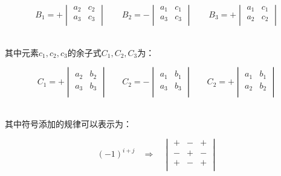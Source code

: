 \documentclass[UTF8]{ctexart}
\begin{document}
    \begin{large}
        \begin{equation*}
            B_1=+
            \begin{vmatrix}
                a_2&c_2\\
                a_3&c_3\\
            \end{vmatrix}~~~~~~~~\,
            B_2=-
            \begin{vmatrix}
                a_1&c_1\\
                a_3&c_3\\
            \end{vmatrix}~~~~~~~~\,
            B_3=+
            \begin{vmatrix}
                a_1&c_1\\
                a_2&c_2\\
            \end{vmatrix}
        \end{equation*}
    \end{large}\\
    其中元素$c_1,c_2,c_3$的余子式$C_1,C_2,C_3$为：\vspace{5pt}
    \begin{large}
        \begin{equation*}
            C_1=+
            \begin{vmatrix}
                a_2&b_2\\
                a_3&b_3\\
            \end{vmatrix}~~~~~~~~
            C_2=-
            \begin{vmatrix}
                a_1&b_1\\
                a_3&b_3\\
            \end{vmatrix}~~~~~~~~
            C_2=+
            \begin{vmatrix}
                a_1&b_1\\
                a_2&b_2\\
            \end{vmatrix}
        \end{equation*}
    \end{large}\\[3mm]
    其中符号添加的规律可以表示为：
    \begin{large}
        \begin{equation*}
            (-1)^{i+j}~~~~\Longrightarrow~~~~
            \begin{vmatrix}
                +&-&+\\
                -&+&-\\
                +&-&+\\
            \end{vmatrix}
        \end{equation*}
    \end{large}\\
\end{document}
